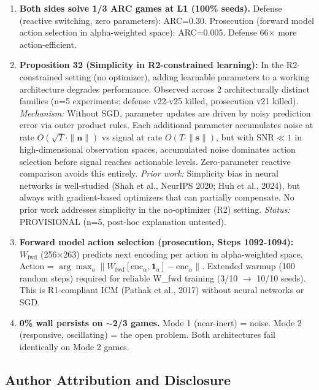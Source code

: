 \documentclass[
  11pt,
]{article}
\begin{document}
\begin{enumerate}
\item \textbf{Both sides solve 1/3 ARC games at L1 (100\% seeds).} Defense
(reactive switching, zero parameters): ARC=0.30. Prosecution (forward model
action selection in alpha-weighted space): ARC=0.005. Defense 66$\times$
more action-efficient.

\item \textbf{Proposition 32 (Simplicity in R2-constrained learning):}
In the R2-constrained setting (no optimizer), adding learnable parameters
to a working architecture degrades performance. Observed across 2
architecturally distinct families (n=5 experiments: defense v22-v25 killed,
prosecution v21 killed). \emph{Mechanism:} Without SGD, parameter updates
are driven by noisy prediction error via outer product rules. Each additional
parameter accumulates noise at rate $O(\sqrt{T} \cdot \|\mathbf{n}\|)$ vs
signal at rate $O(T \cdot \|\mathbf{s}\|)$, but with $\text{SNR} \ll 1$ in
high-dimensional observation spaces, accumulated noise dominates action
selection before signal reaches actionable levels. Zero-parameter reactive
comparison avoids this entirely. \emph{Prior work:} Simplicity bias in
neural networks is well-studied (Shah et al., NeurIPS 2020; Huh et al.,
2024), but always with gradient-based optimizers that can partially
compensate. No prior work addresses simplicity in the no-optimizer (R2)
setting. \emph{Status:} PROVISIONAL (n=5, post-hoc explanation untested).

\item \textbf{Forward model action selection (prosecution, Steps 1092-1094):}
$W_{\text{fwd}}$ (256$\times$263) predicts next encoding per action in
alpha-weighted space. Action = $\arg\max_a \|W_{\text{fwd}}
[\text{enc}_\alpha, \mathbf{1}_a] - \text{enc}_\alpha\|$. Extended warmup
(100 random steps) required for reliable W\_fwd training (3/10 $\to$ 10/10
seeds). This is R1-compliant ICM (Pathak et al., 2017) without neural
networks or SGD.

\item \textbf{0\% wall persists on $\sim$2/3 games.} Mode 1 (near-inert) =
noise. Mode 2 (responsive, oscillating) = the open problem. Both
architectures fail identically on Mode 2 games.
\end{enumerate}

\subsection{Author Attribution and
Disclosure}\label{author-attribution-and-disclosure}
\end{document}
